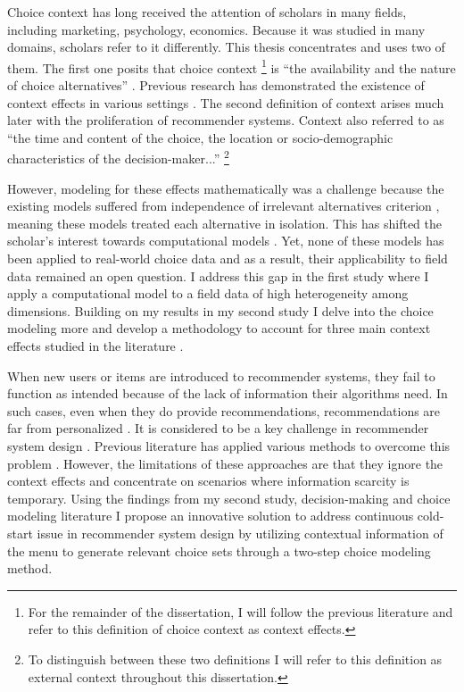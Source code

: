 \documentclass[a4paper,12pt]{article}
\begin{document}
Choice context has long received the attention of scholars in many fields, including marketing, psychology, economics. Because it was studied in many domains, scholars refer to it differently. This thesis concentrates and uses two of them. The first one posits that choice context \footnote{For the remainder of the dissertation, I will follow the previous literature \citep{truebloodEtAl13} and refer to this definition of choice context as context effects.} is ``the availability and the nature of choice alternatives'' \citep{tversky1972elimination, huberEtAl82, simonson89}. Previous research has demonstrated the existence of context effects in various settings \citep{herne1997decoy, soltani2012range, evangelidisEtAl18,  wuConsguner20}. The second definition of context arises much later with the proliferation of recommender systems. Context also referred to as ``the time and content of the choice, the location or socio-demographic characteristics of the decision-maker...'' \citep{adomavicius2011context}\footnote{To distinguish between these two definitions I will refer to this definition as external context throughout this dissertation.}

However, modeling for these effects mathematically was a challenge because the existing models suffered from independence of irrelevant alternatives criterion \citep{luce59}, meaning these models treated each alternative in isolation. This has shifted the scholar's interest towards computational models \citep{usher2001time, roe2001multialternative, trueblood2014multiattribute, noguchi2018multialternative}. Yet, none of these models has been applied to real-world choice data and as a result, their applicability to field data remained an open question. I address this gap in the first study where I apply a computational model to a field data of high heterogeneity among dimensions. Building on my results in my second study I delve into the choice modeling more and develop a methodology to account for three main context effects studied in the literature \citep{truebloodEtAl13}. 

When new users or items are introduced to recommender systems, they fail to function as intended because of the lack of information their algorithms need. In such cases, even when they do provide recommendations, recommendations are far from personalized \citep{lika2014facing}. It is considered to be a key challenge in recommender system design \citep{park2009pairwise}. Previous literature has applied various methods to overcome this problem \citep{guy2009personalized, aharon2013off, bykau2013coping, saveski2014item}. However, the limitations of these approaches are that they ignore the context effects and concentrate on scenarios where information scarcity is temporary. Using the findings from my second study, decision-making and choice modeling literature I propose an innovative solution to address continuous cold-start issue in recommender system design by utilizing contextual information of the menu to generate relevant choice sets through a two-step choice modeling method. 
\end{document}
